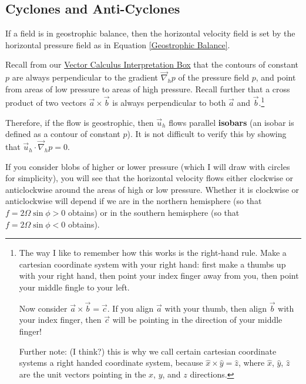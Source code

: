 \subsection{Cyclones and Anti-Cyclones}\label{Cyclones}

If a field is in geostrophic balance, then the horizontal velocity field is set by the horizontal pressure field as in Equation \ref{Geostrophic Balance}. 

Recall from our \hyperref[VC Interp]{Vector Calculus Interpretation Box} that the contours of constant \(p\) are always perpendicular to the gradient \(\vec{\nabla}_h p\) of the pressure field \(p\), and point from areas of low pressure to areas of high pressure. Recall further that a cross product of two vectors \(\vec{a}\times\vec{b}\) is always perpendicular to both \(\vec{a}\) and \(\vec{b}\).\footnote{
    The way I like to remember how this works is the right-hand rule. Make a cartesian coordinate system with your right hand: first make a thumbs up with your right hand, then point your index finger away from you, then point your middle fingle to your left.

    Now consider \(\vec{a}\times\vec{b}=\vec{c}\). If you align \(\vec{a}\) with your thumb, then align \(\vec{b}\) with your index finger, then \(\vec{c}\) will be pointing in the direction of your middle finger!

    Further note: (I think?) this is why we call certain cartesian coordinate systems a right handed coordinate system, because \(\hat{x}\times\hat{y}=\hat{z}\), where \(\hat{x}\), \(\hat{y}\), \(\hat{z}\) are the unit vectors pointing in the \(x\), \(y\), and \(z\) directions.
}

Therefore, if the flow is geostrophic, then \(\vec{u}_h\) flows parallel \textbf{isobars} (an isobar is defined as a contour of constant \(p\)). It is not difficult to verify this by showing that \(\vec{u}_h\cdot\vec{\nabla}_h p=0\).

If you consider blobs of higher or lower pressure (which I will draw with circles for simplicity), you will see that the horizontal velocity flows either clockwise or anticlockwise around the areas of high or low pressure. Whether it is clockwise or anticlockwise will depend if we are in the northern hemisphere (so that \(f=2\Omega\sin\phi>0\) obtains) or in the southern hemisphere (so that \(f=2\Omega\sin\phi<0\) obtains).

